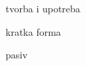 
\author{Tomislav Mamić}

	
	\begin{hyou}
		\item tvorba i upotreba
		\item kratka forma
		\item pasiv
	\end{hyou}
